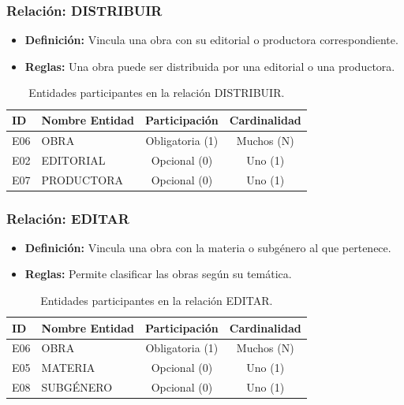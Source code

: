 \subsubsection{Relación: DISTRIBUIR}
\begin{itemize}
	\item\textbf{Definición:} Vincula una obra con su editorial o productora correspondiente.
	\item\textbf{Reglas:} Una obra puede ser distribuida por una editorial o una productora.
\end{itemize}

\begin{table}[H]
	\centering
	\caption{Entidades participantes en la relación DISTRIBUIR.}
	\label{tab:rel_distribuir}
	\small
	\begin{tabularx}{\textwidth}{X l c c}
		\toprule
		\textbf{ID} & \textbf{Nombre Entidad} & \textbf{Participación} & \textbf{Cardinalidad} \\
		\midrule
		E06 & OBRA & Obligatoria (1) & Muchos (N) \\
		\addlinespace
		E02 & EDITORIAL & Opcional (0) & Uno (1) \\
		\addlinespace
		E07 & PRODUCTORA & Opcional (0) & Uno (1) \\
		\bottomrule
	\end{tabularx}
\end{table}

\subsubsection{Relación: EDITAR}
\begin{itemize}
	\item\textbf{Definición:} Vincula una obra con la materia o subgénero al que pertenece.
	\item\textbf{Reglas:} Permite clasificar las obras según su temática.
\end{itemize}

\begin{table}[H]
	\centering
	\caption{Entidades participantes en la relación EDITAR.}
	\label{tab:rel_editar}
	\small
	\begin{tabularx}{\textwidth}{X l c c}
		\toprule
		\textbf{ID} & \textbf{Nombre Entidad} & \textbf{Participación} & \textbf{Cardinalidad} \\
		\midrule
		E06 & OBRA & Obligatoria (1) & Muchos (N) \\
		\addlinespace
		E05 & MATERIA & Opcional (0) & Uno (1) \\
		\addlinespace
		E08 & SUBGÉNERO & Opcional (0) & Uno (1) \\
		\bottomrule
	\end{tabularx}
\end{table}

